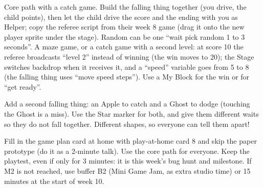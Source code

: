 \begin{differentiation}
\supportpath Core path with a catch game. Build the falling thing together (you drive, the child points), then let the child drive the score and the ending with you as Helper; copy the referee script from their week 8 game (drag it onto the new player sprite under the stage). Random can be one \enquote{wait pick random 1 to 3 seconds}.
\extensionpath A maze game, or a catch game with a second level: at score 10 the referee broadcasts \enquote{level 2} instead of winning (the win moves to 20); the Stage switches backdrop when it receives it, and a \enquote{speed} variable goes from 5 to 8 (the falling thing uses \enquote{move speed steps}). Use a My Block for the win or for \enquote{get ready}.
\end{differentiation}

\begin{stretchchallenge}
Add a second falling thing: an Apple to catch and a Ghost to dodge (touching the Ghost is a miss). Use the Star marker for both, and give them different waits so they do not fall together. Different shapes, so everyone can tell them apart!
\end{stretchchallenge}

\begin{teachernote}
Fill in the game plan card at home with play-at-home card 8 and skip the paper prototype (do it as a 2-minute talk). Use the core path for everyone. Keep the playtest, even if only for 3 minutes: it is this week's bug hunt and milestone. If M2 is not reached, use buffer B2 (Mini Game Jam, as extra studio time) or 15 minutes at the start of week 10.
\end{teachernote}
